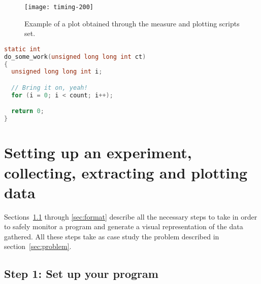 \begin{figure}
\centering
\texttt{[image: timing-200]}
\caption{Example of a plot obtained through the measure and plotting scripts set.}
\label{fig:timing-200}
\end{figure}

\begin{lstlisting}[caption={``Computation''-intensive algorithm used as case study in this tutorial.},label={lst:do_some_work},language=C]
static int
do_some_work(unsigned long long int ct)
{
  unsigned long long int i;

  // Bring it on, yeah!
  for (i = 0; i < count; i++);

  return 0;
}
\end{lstlisting}

\section{Setting up an experiment, collecting, extracting and plotting data}
\label{sec:process}
Sections~\ref{sec:setup} through \ref{sec:format} describe all the necessary steps to take in order to safely monitor a program and generate a visual representation of the data gathered. All these steps take as case study the problem described in section~\ref{sec:problem}.

\subsection{Step 1: Set up your program}
\label{sec:setup}

